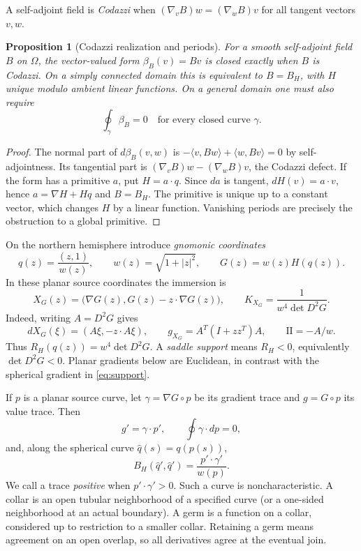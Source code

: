 \documentclass[11pt]{amsart}
\newtheorem{proposition}[theorem]{Proposition}
\theoremstyle{definition}
\theoremstyle{remark}
\newcommand{\II}{\mathrm{II}}\newcommand{\Gmap}{\mathcal G}
\numberwithin{equation}{section}
\begin{document}
A self-adjoint field is \emph{Codazzi} when
$(\nabla_vB)w=(\nabla_wB)v$ for all tangent vectors $v,w$.
\begin{proposition}[Codazzi realization and periods]\label{prop:codazzi}
For a smooth self-adjoint field $B$ on $\Omega$, the vector-valued form
$\beta_B(v)=Bv$ is closed exactly when $B$ is Codazzi. On a simply
connected domain this is equivalent to $B=B_H$, with $H$ unique modulo
ambient linear functions. On a general domain one must also require
\[
 \oint_\gamma\beta_B=0\quad\text{for every closed curve }\gamma.
\]
\end{proposition}
\begin{proof}
The normal part of $d\beta_B(v,w)$ is
$-\langle v,Bw\rangle+\langle w,Bv\rangle=0$ by self-adjointness.
Its tangential part is $(\nabla_vB)w-(\nabla_wB)v$, the Codazzi defect.
If the form has a primitive $a$, put $H=a\cdot q$. Since $da$ is tangent,
$dH(v)=a\cdot v$, hence $a=\nabla H+Hq$ and $B=B_H$.
The primitive is unique up to a constant vector, which changes $H$ by a
linear function. Vanishing periods are precisely the obstruction to a
global primitive.
\end{proof}

On the northern hemisphere introduce \emph{gnomonic coordinates}
\[
 q(z)=\frac{(z,1)}{w(z)},\qquad w(z)=\sqrt{1+|z|^2},
 \qquad G(z)=w(z)H(q(z)).
\]
In these planar source coordinates the immersion is
\begin{equation}\label{eq:planar}
 X_G(z)=\bigl(\nabla G(z),G(z)-z\cdot\nabla G(z)\bigr),
 \qquad K_{X_G}=\frac1{w^4\det D^2G}.
\end{equation}
Indeed, writing $A=D^2G$ gives
\[
 dX_G(\xi)=(A\xi,-z\cdot A\xi),\qquad
 g_{X_G}=A^T(I+zz^T)A,\qquad \II=-A/w.
\]
Thus $R_H(q(z))=w^4\det D^2G$. A \emph{saddle support} means
$R_H<0$, equivalently $\det D^2G<0$. Planar gradients below are
Euclidean, in contrast with the spherical gradient in \eqref{eq:support}.

If $p$ is a planar source curve, let $\gamma=\nabla G\circ p$ be its
gradient trace and $g=G\circ p$ its value trace. Then
\begin{equation}\label{eq:action}
 g'=\gamma\cdot p',\qquad \oint\gamma\cdot dp=0,
\end{equation}
and, along the spherical curve $\widehat q(s)=q(p(s))$,
\begin{equation}\label{eq:tangent-sign}
 B_H(\widehat q',\widehat q')=\frac{p'\cdot\gamma'}{w(p)}.
\end{equation}
We call a trace \emph{positive} when $p'\cdot\gamma'>0$.
Such a curve is noncharacteristic. A collar is an open tubular
neighborhood of a specified curve (or a one-sided neighborhood at an
actual boundary). A germ is a function on a collar, considered up to restriction
to a smaller collar. Retaining a germ means agreement on an open overlap,
so all derivatives agree at the eventual join.
\end{document}
